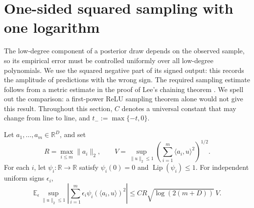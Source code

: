 \section{One-sided squared sampling with one logarithm}
\label{sec:sampling}

The low-degree component of a posterior draw depends on the observed
sample, so its empirical error must be controlled uniformly over all
low-degree polynomials. We use the squared negative part of its signed
output: this records the amplitude of predictions with the wrong sign.
The required sampling estimate follows from a metric estimate in the
proof of Lee's chaining theorem
\cite[Lemma~2.12, equation~(2.20)]{Lee2023}. We spell out the comparison:
a first-power ReLU sampling theorem alone would not give this result.
Throughout this section, $C$ denotes a universal constant that may change
from line to line, and $t_-:=\max\{-t,0\}$.

\begin{lemma}\label{lem:squared-process}
Let $a_1,\ldots,a_m\in\mathbb R^D$, and set
\[
 R=\max_{i\le m}\|a_i\|_2,
 \qquad V=\sup_{\|u\|_2\le1}
       \left(\sum_{i=1}^m\langle a_i,u\rangle^2\right)^{1/2}.
\]
For each $i$, let $\psi_i:\mathbb R\to\mathbb R$ satisfy
$\psi_i(0)=0$ and $\operatorname{Lip}(\psi_i)\le1$.
For independent uniform signs $\epsilon_i$,
\begin{equation}\label{eq:squared-process}
 \mathbb E_\epsilon\sup_{\|u\|_2\le1}
 \left|\sum_{i=1}^m\epsilon_i\psi_i(\langle a_i,u\rangle)^2\right|
 \le C R\sqrt{\log(2(m+D))}\,V.
\end{equation}
\end{lemma}

